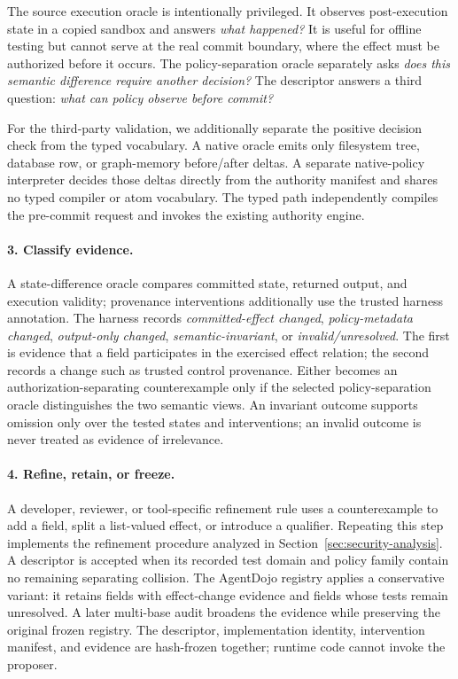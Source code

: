 The source execution oracle is intentionally privileged. It observes post-execution
state in a copied sandbox and answers \emph{what happened?}  It is useful for
offline testing but cannot serve at the real commit boundary, where the effect
must be authorized before it occurs. The policy-separation oracle separately asks
\emph{does this semantic difference require another decision?}  The descriptor
answers a third question: \emph{what can policy observe before commit?}

For the third-party validation, we additionally separate the positive decision
check from the typed vocabulary. A native oracle emits only filesystem tree,
database row, or graph-memory before/after deltas. A separate native-policy
interpreter decides those deltas directly from the authority manifest and
shares no typed compiler or atom vocabulary. The typed path independently
compiles the pre-commit request and invokes the existing authority engine.

\paragraph{3. Classify evidence.}
A state-difference oracle compares committed state, returned output, and
execution validity; provenance interventions additionally use the trusted
harness annotation.  The harness records \emph{committed-effect changed},
\emph{policy-metadata changed}, \emph{output-only changed},
\emph{semantic-invariant}, or \emph{invalid/unresolved}.  The first is evidence
that a field participates in the exercised effect relation; the second records
a change such as trusted control provenance.  Either becomes an
authorization-separating counterexample only if the selected policy-separation oracle
distinguishes the two semantic views.  An invariant outcome supports omission
only over the tested states and interventions; an invalid outcome is never
treated as evidence of irrelevance.

\paragraph{4. Refine, retain, or freeze.}
A developer, reviewer, or tool-specific refinement rule uses a counterexample
to add a field, split a list-valued effect, or introduce a qualifier. Repeating
this step implements the refinement procedure analyzed in
Section~\ref{sec:security-analysis}. A descriptor is accepted when its recorded
test domain and policy family contain no remaining separating collision. The
AgentDojo registry applies a conservative variant: it retains fields with
effect-change evidence and fields whose tests remain unresolved. A later
multi-base audit broadens the evidence while preserving the original frozen
registry.
The descriptor, implementation identity, intervention manifest, and evidence
are hash-frozen together; runtime code cannot invoke the proposer.

